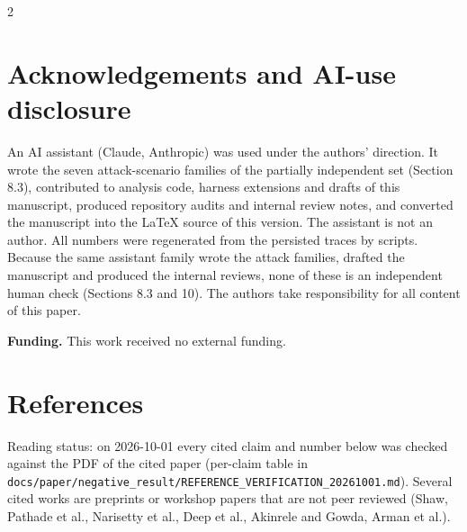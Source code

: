\documentclass[9pt]{extarticle}
\begin{document}
\begin{multicols}{2}
\section*{Acknowledgements and AI-use disclosure}
An AI assistant (Claude, Anthropic) was used under the authors' direction. It wrote the seven attack-scenario families of the partially independent set (Section 8.3),
contributed to analysis code, harness extensions and drafts of this manuscript, produced repository audits and internal review notes, and converted the manuscript into the \LaTeX{} source of this version.
The assistant is not an author. All numbers were regenerated from the persisted traces by scripts.
Because the same assistant family wrote the attack families, drafted the manuscript and produced the internal reviews, none of these is an independent human check (Sections 8.3 and 10).
The authors take responsibility for all content of this paper.

\medskip\noindent\textbf{Funding.} This work received no external funding.

\section{References}

Reading status: on 2026-10-01 every cited claim and number below was checked against the PDF of the cited paper (per-claim table in \texttt{docs/\allowbreak{}paper/\allowbreak{}negative\_\allowbreak{}result/\allowbreak{}REFERENCE\_\allowbreak{}VERIFICATION\_\allowbreak{}20261001.md}). Several cited works are preprints or workshop papers that are not peer reviewed (Shaw, Pathade et al., Narisetty et al., Deep et al., Akinrele and Gowda, Arman et al.).
{\footnotesize\setlength{\itemsep}{0pt}\setlength{\parskip}{0pt}
\nocite{*}

}

\end{multicols}
\end{document}
